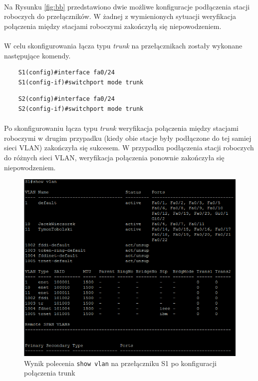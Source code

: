 \documentclass[wide,a4paper,titlepage,12pt] {article}
\begin{document}
  \paragraph{}
  Na Rysunku \ref{fig:bb} przedstawiono dwie możliwe konfiguracje podłączenia stacji roboczych do przełączników. W żadnej z wymienionych sytuacji weryfikacja połączenia między stacjami roboczymi zakończyłą się niepowodzeniem.

  \paragraph{}
  W celu skonfigurowania łącza typu \emph{trunk} na przełącznikach zostały wykonane następujące komendy.

  \begin{verbatim}
    S1(config)#interface fa0/24
    S1(config-if)#switchport mode trunk
  \end{verbatim}

  \begin{verbatim}
    S2(config)#interface fa0/24
    S2(config-if)#switchport mode trunk
  \end{verbatim}

  \paragraph{}
  Po skonfigurowaniu łącza typu \emph{trunk} weryfikacja połączenia między stacjami roboczymi w drugim przypadku (kiedy obie stacje były podłączone do tej samiej sieci VLAN) zakończyła się sukcesem. W przypadku podłączenia stacji roboczych do różnych sieci VLAN, weryfikacja połączenia ponownie zakończyła się niepowodzeniem.

  \begin{figure}[H]
    \begin{center}
      \includegraphics[width=\textwidth]{img/t9.PNG}
      \caption{Wynik polecenia \texttt{show vlan} na przełączniku S1 po konfiguracji połączenia trunk}
      \label{fig:t9}
    \end{center}
  \end{figure}
\end{document}
